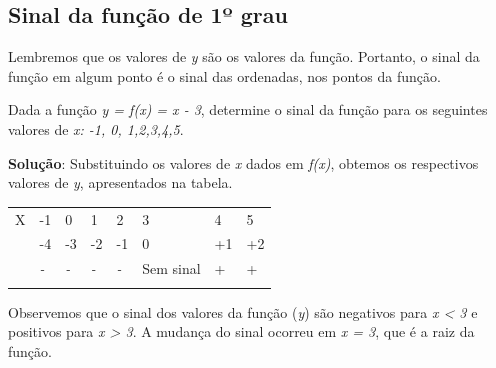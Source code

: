 \subsection{Sinal da função de 1º grau}

Lembremos que os valores de \textit{y} são os valores da função. Portanto, o sinal da função em algum ponto é o sinal das ordenadas, nos pontos da função.

\begin{texemplo}
Dada a função \textit{y = f(x) = x - 3}, determine o sinal da função para os seguintes valores de \textit{x: -1, 0, 1,2,3,4,5}.

\textbf{Solução}: Substituindo os valores de \textit{x} dados em \textit{f(x)}, obtemos os respectivos valores de \textit{y}, apresentados na tabela.

\begin{table}[H]
 			\centering
\begin{tabular}{p{0.69in}p{0.27in}p{0.27in}p{0.27in}p{0.27in}p{0.67in}p{0.29in}p{0.19in}}
\hline
\multicolumn{1}{|p{0.69in}}{X} & 
\multicolumn{1}{|p{0.27in}}{-1} & 
\multicolumn{1}{|p{0.27in}}{0} & 
\multicolumn{1}{|p{0.27in}}{1} & 
\multicolumn{1}{|p{0.27in}}{2} & 
\multicolumn{1}{|p{0.67in}}{3} & 
\multicolumn{1}{|p{0.29in}}{4} & 
\multicolumn{1}{|p{0.19in}|}{5} \\
\hhline{--------}
\multicolumn{1}{|p{0.69in}}{Y} & 
\multicolumn{1}{|p{0.27in}}{-4} & 
\multicolumn{1}{|p{0.27in}}{-3} & 
\multicolumn{1}{|p{0.27in}}{-2} & 
\multicolumn{1}{|p{0.27in}}{-1} & 
\multicolumn{1}{|p{0.67in}}{0} & 
\multicolumn{1}{|p{0.29in}}{+1} & 
\multicolumn{1}{|p{0.19in}|}{+2} \\
\hhline{--------}
\multicolumn{1}{|p{0.69in}}{Sinal de Y} & 
\multicolumn{1}{|p{0.27in}}{\textit{-}} & 
\multicolumn{1}{|p{0.27in}}{\textit{-}} & 
\multicolumn{1}{|p{0.27in}}{\textit{-}} & 
\multicolumn{1}{|p{0.27in}}{\textit{-}} & 
\multicolumn{1}{|p{0.67in}}{Sem sinal} & 
\multicolumn{1}{|p{0.29in}}{+} & 
\multicolumn{1}{|p{0.19in}|}{+} \\
\hhline{--------}

\end{tabular}
 \end{table}

Observemos que o sinal dos valores da função (\textit{y}) são negativos para \textit{x < 3} e positivos para \textit{x > 3}. A mudança do sinal ocorreu em \textit{x = 3}, que é a raiz da função.


\end{texemplo}
